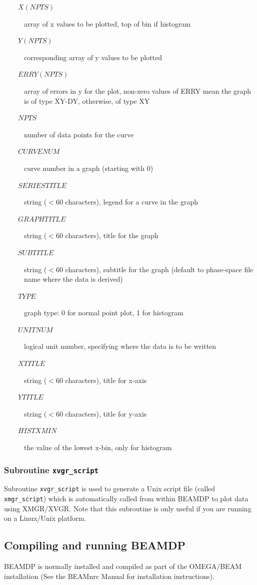 \documentclass[12pt,twoside]{article}
\begin{document}
\begin{description} \item [~~~~$X(NPTS)$]  array of x values to be
plotted, top of bin if histogram \item [~~~~$Y(NPTS)$]  corresponding
array of y values to be plotted \item [~~~~$ERRY(NPTS)$]  array of errors
in y for the plot, non-zero values of ERRY mean the graph is of type
XY-DY, otherwise, of type XY \item [~~~~$NPTS$]  number of data points for
the curve \item [~~~~$CURVENUM$]  curve number in a graph (starting with
0) \item [~~~~$SERIESTITLE$]  string ($<$60 characters), legend for a
curve in the graph \item [~~~~$GRAPHTITLE$]   string ($<$60 characters),
title for the graph \item [~~~~$SUBTITLE$]  string ($<$60 characters),
subtitle for the graph (default to phase-space file name where the data is
derived) \item [~~~~$TYPE$]  graph type: 0 for normal point plot, 1 for
histogram \item [~~~~$UNITNUM$]  logical unit number, specifying where the
data is to be written \item [~~~~$XTITLE$]  string ($<$60 characters),
title for x-axis \item [~~~~$YTITLE$]  string ($<$60 characters), title
for y-axis \item [~~~~$HISTXMIN$]  the value of the lowest x-bin, only for
histogram \end{description}


\subsubsection{Subroutine {\tt xvgr\_script}}
Subroutine {\tt xvgr\_script}  is used to generate a Unix script file
(called {\tt xmgr\_script}) which is automatically called from within
BEAMDP to plot data using XMGR/XVGR.  Note that this subroutine is only
useful if you are running on a Linux/Unix platform.

\subsection{Compiling and running BEAMDP}

BEAMDP is normally installed and compiled as part of the OMEGA/BEAM
installation (See the BEAMnrc Manual\cite{Ro04a} for installation
instructions).
\end{document}

